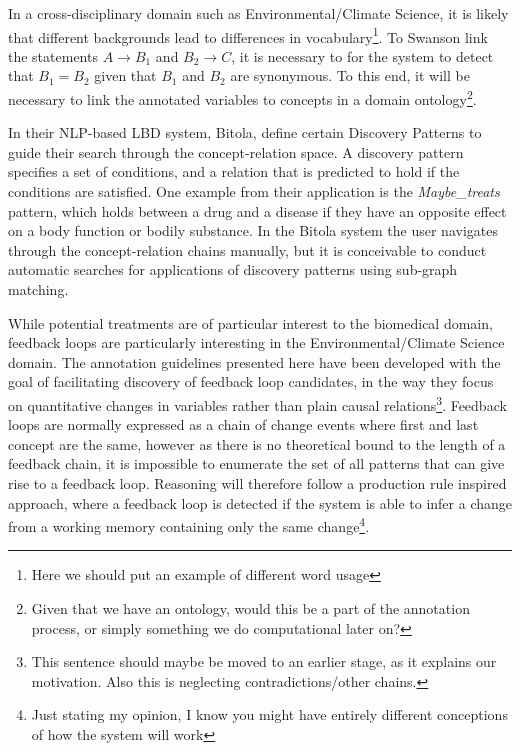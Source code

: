 \documentclass[10pt, a4paper]{article}
\begin{document}
In a cross-disciplinary domain such as Environmental/Climate Science, it is likely that different backgrounds lead to differences in vocabulary\footnote{Here we should put an example of different word usage}.
To Swanson link the statements $A \to B_1$ and $B_2 \to C$, it is necessary to for the system to detect that $B_1 = B_2$ given that $B_1$ and $B_2$ are synonymous.
To this end, it will be necessary to link the annotated variables to concepts in a domain ontology\footnote{Given that we have an ontology, would this be a part of the annotation process, or simply something we do computational later on?}.

In their NLP-based LBD system, Bitola,  define certain Discovery Patterns to guide their search through the concept-relation space. A discovery pattern specifies a set of conditions, and a relation that is predicted to hold if the conditions are satisfied. One example from their application is the \emph{Maybe\_treats} pattern, which holds between a drug and a disease if they have an opposite effect on a body function or bodily substance. In the Bitola system the user navigates through the concept-relation chains manually, but it is conceivable to conduct automatic searches for applications of discovery patterns using sub-graph matching.

While potential treatments are of particular interest to the biomedical domain, feedback loops are particularly interesting in the Environmental/Climate Science domain. 
The annotation guidelines presented here have been developed with the goal of facilitating discovery of feedback loop candidates, in the way they focus on quantitative changes in variables rather than plain causal relations\footnote{This sentence should maybe be moved to an earlier stage, as it explains our motivation. Also this is neglecting contradictions/other chains.}.
Feedback loops are normally expressed as a chain of change events where first and last concept are the same, however as there is no theoretical bound to the length of a feedback chain, it is impossible to enumerate the set of all patterns that can give rise to a feedback loop.
Reasoning will therefore follow a production rule inspired approach, where a feedback loop is detected if the system is able to infer a change from a working memory containing only the same change\footnote{Just stating my opinion, I know you might have entirely different conceptions of how the system will work}.
\end{document}
